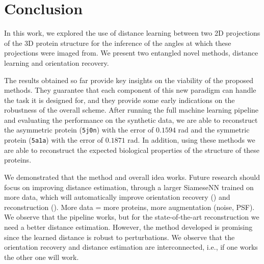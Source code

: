 \section{Conclusion}


 In this work, we explored the use of distance learning between two 2D projections of the 3D protein structure for the inference of the angles at which these projections were imaged from.
We present two entangled novel methods, distance learning and orientation recovery.

The results obtained so far provide key insights on the viability of the proposed methods.
They guarantee that each component of this new paradigm can handle the task it is designed for, and they provide some early indications on the robustness of the overall scheme.
After running the full machine learning pipeline and evaluating the performance on the synthetic data, we are able to reconstruct the asymmetric protein (\texttt{5j0n}) with the error of $0.1594$ rad and the symmetric protein (\texttt{5a1a}) with the error of $0.1871$ rad.
In addition, using these methods we are able to reconstruct the expected biological properties of the structure of these proteins.

We demonstrated that the method and overall idea works. Future research should focus on improving distance estimation, through a larger SiameseNN trained on more data, which will automatically improve orientation recovery () and reconstruction ().
More data = more proteins, more augmentation (noise, PSF).
We observe that the pipeline works, but for the state-of-the-art reconstruction we need a better distance estimation.
However, the method developed is promising since the learned distance is robust to perturbations.
We observe that the orientation recovery and distance estimation are interconnected, i.e., if one works the other one will work.

